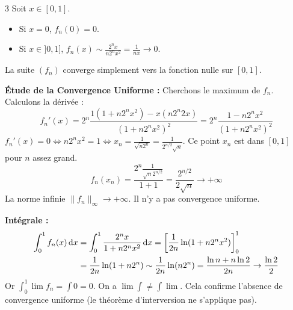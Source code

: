 \begin{correction}{3}
Soit $x \in [0, 1]$.
\begin{itemize}
    \item Si $x = 0$, $f_n(0) = 0$.
    \item Si $x \in ]0, 1]$, $f_n(x) \sim \frac{2^n x}{n 2^n x^2} = \frac{1}{nx} \to 0$.
\end{itemize}
La suite $(f_n)$ converge simplement vers la fonction nulle sur $[0, 1]$.

\textbf{Étude de la Convergence Uniforme :}
Cherchons le maximum de $f_n$. Calculons la dérivée :
\[f_n'(x) = 2^n \frac{1(1+n 2^n x^2) - x(n 2^n 2x)}{(1+n 2^n x^2)^2} = 2^n \frac{1 - n 2^n x^2}{(1+n 2^n x^2)^2}\]
$f_n'(x) = 0 \iff n 2^n x^2 = 1 \iff x_n = \frac{1}{\sqrt{n 2^n}} = \frac{1}{2^{n/2}\sqrt{n}}$.
Ce point $x_n$ est dans $[0, 1]$ pour $n$ assez grand.
\[f_n(x_n) = \frac{2^n \frac{1}{\sqrt{n} 2^{n/2}}}{1+1} = \frac{2^{n/2}}{2\sqrt{n}} \to +\infty\]
La norme infinie $\|f_n\|_\infty \to +\infty$. Il n'y a pas convergence uniforme.

\textbf{Intégrale :}
\begin{align*}
    \int_0^1 f_n(x) \,\mathrm{d}x &= \int_0^1 \frac{2^n x}{1+n 2^n x^2} \,\mathrm{d}x = \left[ \frac{1}{2n} \ln(1+n 2^n x^2) \right]_0^1 \\
    &= \frac{1}{2n} \ln(1+n 2^n) \sim \frac{1}{2n} \ln(n 2^n) = \frac{\ln n + n \ln 2}{2n} \to \frac{\ln 2}{2} 
\end{align*}
Or $\int_0^1 \lim f_n = \int 0 = 0$.
On a $\lim \int \neq \int \lim$. Cela confirme l'absence de convergence uniforme (le théorème d'interversion ne s'applique pas).
\end{correction}

